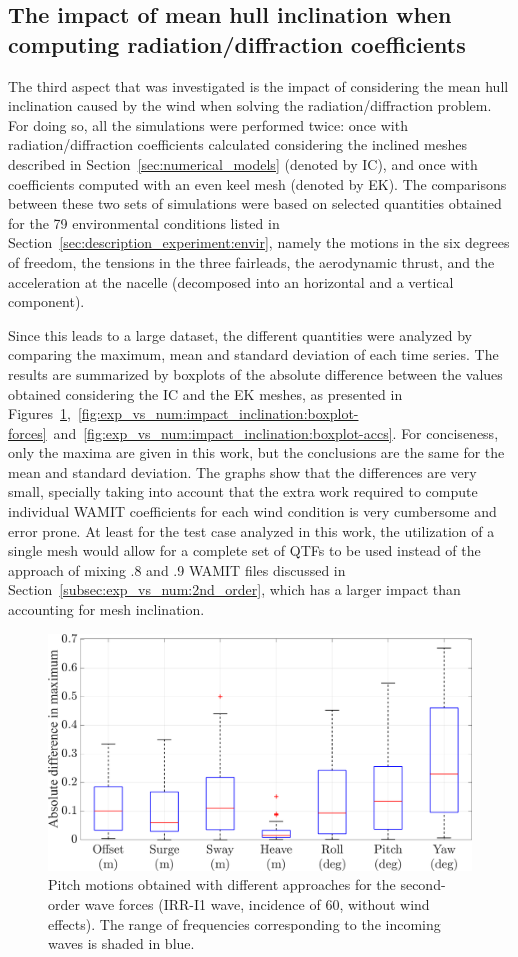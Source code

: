 \subsection{The impact of mean hull inclination when computing radiation/diffraction coefficients} \label{subsec:exp_vs_num:impact_inclination}
The third aspect that was investigated is the impact of considering the mean hull inclination caused by the wind when solving the radiation/diffraction problem. For doing so, all the simulations were performed twice: once with radiation/diffraction coefficients calculated considering the inclined meshes described in Section~\ref{sec:numerical_models} (denoted by IC), and once with coefficients computed with an even keel mesh (denoted by EK). The comparisons between these two sets of simulations were based on selected quantities obtained for the 79 environmental conditions listed in Section~\ref{sec:description_experiment:envir}, namely the motions in the six degrees of freedom, the tensions in the three fairleads, the aerodynamic thrust, and the acceleration at the nacelle (decomposed into an horizontal and a vertical component). 

Since this leads to a large dataset, the different quantities were analyzed by comparing the maximum, mean and standard deviation of each time series. The results are summarized by boxplots of the absolute difference between the values obtained considering the IC and the EK meshes, as presented in Figures~\ref{fig:exp_vs_num:impact_inclination:boxplot-motions},~\ref{fig:exp_vs_num:impact_inclination:boxplot-forces}~and~\ref{fig:exp_vs_num:impact_inclination:boxplot-accs}. For conciseness, only the maxima are given in this work, but the conclusions are the same for the mean and standard deviation. The graphs show that the differences are very small, specially taking into account that the extra work required to compute individual WAMIT coefficients for each wind condition is very cumbersome and error prone. At least for the test case analyzed in this work, the utilization of a single mesh would allow for a complete set of QTFs to be used instead of the approach of mixing .8 and .9 WAMIT files discussed in Section~\ref{subsec:exp_vs_num:2nd_order}, which has a larger impact than accounting for mesh inclination.
\begin{figure}[!hbtp]
	\centering
	\includegraphics[width=0.5\columnwidth]{./figures/ek_vs_ic-motions}	
	\caption{Pitch motions obtained with different approaches for the second-order wave forces (IRR-I1 wave, incidence of 60\textdegree{}, without wind effects). The range of frequencies corresponding to the incoming waves is shaded in blue.} \label{fig:exp_vs_num:impact_inclination:boxplot-motions}%
\end{figure}%

